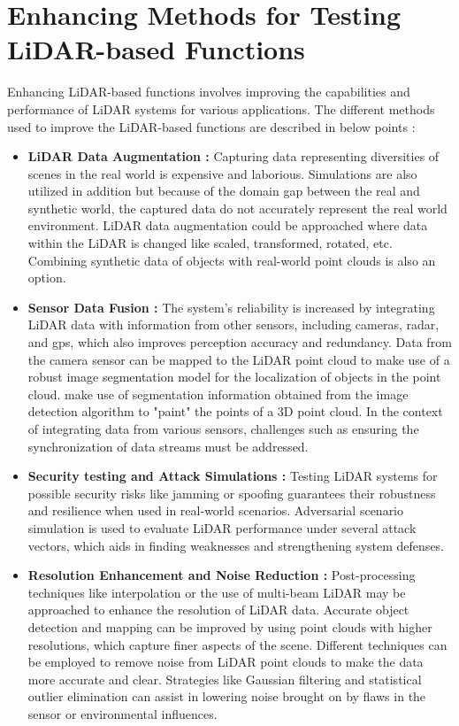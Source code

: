 \section{Enhancing Methods for Testing LiDAR-based Functions}
Enhancing LiDAR-based functions involves improving the capabilities and performance of LiDAR systems for various applications. The different methods used to improve the LiDAR-based functions are described in below points :
\begin{itemize}
    \item \textbf{LiDAR Data Augmentation : }
    Capturing data representing diversities of scenes in the real world is expensive and laborious. Simulations are also utilized in addition but because of the domain gap between the real and synthetic world, the captured data do not accurately represent the real world environment. LiDAR data augmentation could be approached where data within the LiDAR is changed like scaled, transformed, rotated, etc. Combining synthetic data of objects with real-world point clouds is also an option.
    \item \textbf{Sensor Data Fusion : }
    The system's reliability is increased by integrating LiDAR data with information from other sensors, including cameras, radar, and \acrshort{gps}, which also improves perception accuracy and redundancy. Data from the camera sensor can be mapped to the LiDAR point cloud to make use of a robust image segmentation model for the localization of objects in the point cloud. \parencite{pointpainting2019} make use of segmentation information obtained from the image detection algorithm to "paint" the points of a 3D point cloud. In the context of integrating data from various sensors, challenges such as ensuring the synchronization of data streams must be addressed.
    \item \textbf{Security testing and Attack Simulations : }
    Testing LiDAR systems for possible security risks like jamming or spoofing guarantees their robustness and resilience when used in real-world scenarios.  Adversarial scenario simulation is used to evaluate LiDAR performance under several attack vectors, which aids in finding weaknesses and strengthening system defenses.
    \item \textbf{Resolution Enhancement and Noise Reduction : }
    Post-processing techniques like interpolation or the use of multi-beam LiDAR may be approached to enhance the resolution of LiDAR data. Accurate object detection and mapping can be improved by using point clouds with higher resolutions, which capture finer aspects of the scene. Different techniques can be employed to remove noise from LiDAR point clouds to make the data more accurate and clear. Strategies like Gaussian filtering and statistical outlier elimination can assist in lowering noise brought on by flaws in the sensor or environmental influences.

\end{itemize}

